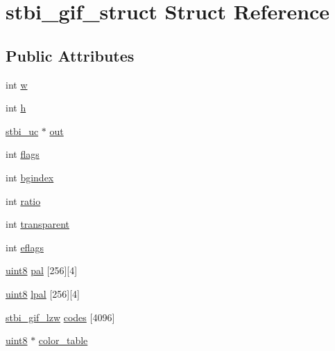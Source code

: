\hypertarget{structstbi__gif__struct}{}\section{stbi\+\_\+gif\+\_\+struct Struct Reference}
\label{structstbi__gif__struct}
\subsection*{Public Attributes}
\begin{DoxyCompactItemize}
\item 
int \hyperlink{structstbi__gif__struct_a28e5c2fb704a64d23a7e8f9013ecda34}{w}
\item 
int \hyperlink{structstbi__gif__struct_a6ce6b990464cdbbe9a408fe26581b296}{h}
\item 
\hyperlink{stb__image_8h_a28eb51a1512ce382ee50f20e1d04d50d}{stbi\+\_\+uc} $\ast$ \hyperlink{structstbi__gif__struct_a1c2d18ea92a86a416e7458cdaa9f4cc3}{out}
\item 
int \hyperlink{structstbi__gif__struct_a3d22eaa3fe69a1d35ff914add9bb6df5}{flags}
\item 
int \hyperlink{structstbi__gif__struct_a0d3690bdbbf0b772d5369c0a29b77cc1}{bgindex}
\item 
int \hyperlink{structstbi__gif__struct_ac082648ce87130679bcde2dd4651c530}{ratio}
\item 
int \hyperlink{structstbi__gif__struct_ab46e0fb6ad50c3caeac8800ef07b78a8}{transparent}
\item 
int \hyperlink{structstbi__gif__struct_aad9790350cb2d775722dc5d55fdfde42}{eflags}
\item 
\hyperlink{stb__image_8c_adde6aaee8457bee49c2a92621fe22b79}{uint8} \hyperlink{structstbi__gif__struct_a3d96c452c7935b3a1ca49cc1ce410686}{pal} \mbox{[}256\mbox{]}\mbox{[}4\mbox{]}
\item 
\hyperlink{stb__image_8c_adde6aaee8457bee49c2a92621fe22b79}{uint8} \hyperlink{structstbi__gif__struct_af2bf4a7890065ce54b8b59c6fd008e5f}{lpal} \mbox{[}256\mbox{]}\mbox{[}4\mbox{]}
\item 
\hyperlink{stb__image_8c_adc667f82a013164649c5ae2de7fcd418}{stbi\+\_\+gif\+\_\+lzw} \hyperlink{structstbi__gif__struct_a4644d2fe2c84e410ab235ea415e9a740}{codes} \mbox{[}4096\mbox{]}
\item 
\hyperlink{stb__image_8c_adde6aaee8457bee49c2a92621fe22b79}{uint8} $\ast$ \hyperlink{structstbi__gif__struct_aa10fee29a36ac4b9cae98300f839d091}{color\+\_\+table}
\item 

\end{DoxyCompactItemize}
